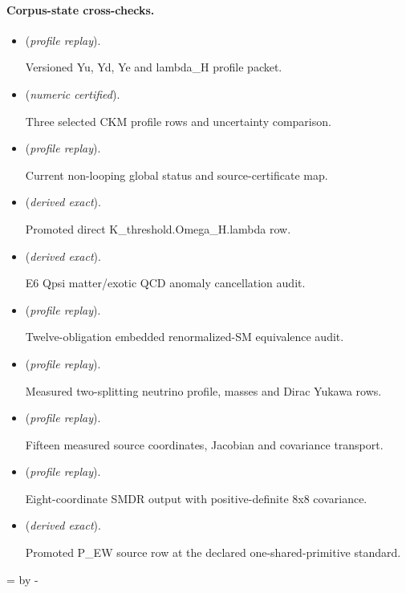 \documentclass[11pt]{article}
\begin{document}
\paragraph{Corpus-state cross-checks.}
\begin{itemize}
\setlength{\itemsep}{0.25em}
\item {} (\emph{profile replay}).\par Versioned Yu, Yd, Ye and lambda\_H profile packet.
\item {} (\emph{numeric certified}).\par Three selected CKM profile rows and uncertainty comparison.
\item {} (\emph{profile replay}).\par Current non-looping global status and source-certificate map.
\item {} (\emph{derived exact}).\par Promoted direct K\_threshold.Omega\_H.lambda row.
\item {} (\emph{derived exact}).\par E6 Qpsi matter/exotic QCD anomaly cancellation audit.
\item {} (\emph{profile replay}).\par Twelve-obligation embedded renormalized-SM equivalence audit.
\item {} (\emph{profile replay}).\par Measured two-splitting neutrino profile, masses and Dirac Yukawa rows.
\item {} (\emph{profile replay}).\par Fifteen measured source coordinates, Jacobian and covariance transport.
\item {} (\emph{profile replay}).\par Eight-coordinate SMDR output with positive-definite 8x8 covariance.
\item {} (\emph{derived exact}).\par Promoted P\_EW source row at the declared one-shared-primitive standard.
\end{itemize}

\par\begingroup{}=\pagegoal\advance{} by -\pagetotal\ifdim\dimen0<7\baselineskip\newpage\fi\endgroup
\end{document}
